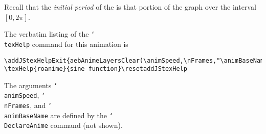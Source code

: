 \documentclass{article}
\newcommand{\cs}[1]{\texttt{\char`\\#1}}
\begin{document}
Recall that the \emph{initial period} of the %
%
\resetaddJStexHelp\space
is that portion of the graph over the interval $ [0, 2\pi] $.

The verbatim listing of the \cs{texHelp} command for this animation is
\begin{Verbatim}[xleftmargin=\parindent,fontsize=\small]
\addJStexHelpExit{aebAnimeLayersClear(\animSpeed,\nFrames,"\animBaseName");}%
\texHelp{roanime}{sine function}\resetaddJStexHelp
\end{Verbatim}
The arguments \cs{animSpeed}, \cs{nFrames}, and \cs{animBaseName} are defined by
the \cs{DeclareAnime} command (not shown).
\end{document}
